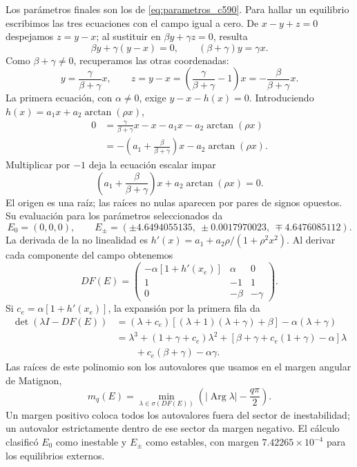 Los parámetros finales son los de \cref{eq:parametros_c590}.
Para hallar un equilibrio escribimos las tres ecuaciones con el campo
igual a cero. De \(x-y+z=0\) despejamos \(z=y-x\); al sustituir en
\(\beta y+\gamma z=0\), resulta
\[
 \beta y+\gamma(y-x)=0,
 \qquad(\beta+\gamma)y=\gamma x.
\]
Como \(\beta+\gamma\ne0\), recuperamos las otras coordenadas:
\[
 y=\frac{\gamma}{\beta+\gamma}x,\qquad
 z=y-x=\left(\frac{\gamma}{\beta+\gamma}-1\right)x
       =-\frac{\beta}{\beta+\gamma}x.
\]
La primera ecuación, con \(\alpha\ne0\), exige
\(y-x-h(x)=0\). Introduciendo \(h(x)=a_1x+a_2\arctan(\rho x)\),
\begin{align*}
 0&=\frac{\gamma}{\beta+\gamma}x-x-a_1x-a_2\arctan(\rho x)\\
  &=-\left(a_1+\frac{\beta}{\beta+\gamma}\right)x
       -a_2\arctan(\rho x).
\end{align*}
Multiplicar por \(-1\) deja la ecuación escalar impar
\[
 \left(a_1+\frac{\beta}{\beta+\gamma}\right)x
           +a_2\arctan(\rho x)=0.
\]
El origen es una raíz; las raíces no nulas aparecen por pares de signos
opuestos. Su evaluación para los parámetros seleccionados da
\begin{equation}
E_0=(0,0,0),\qquad
E_\pm=(\pm4.6494055135,\ \pm0.0017970023,\ \mp4.6476085112).
\label{eq:equilibrios_c590_resultados}
\end{equation}
La derivada de la no linealidad es
\(h'(x)=a_1+a_2\rho/(1+\rho^2x^2)\). Al derivar cada componente del
campo obtenemos
\[
 DF(E)=\begin{pmatrix}
 -\alpha[1+h'(x_e)]&\alpha&0\\
 1&-1&1\\0&-\beta&-\gamma
 \end{pmatrix}.
\]
Si \(c_e=\alpha[1+h'(x_e)]\), la expansión por la primera fila da
\begin{align*}
 \det(\lambda I-DF(E))
 &=(\lambda+c_e)[(\lambda+1)(\lambda+\gamma)+\beta]
       -\alpha(\lambda+\gamma)\\
 &=\lambda^3+(1+\gamma+c_e)\lambda^2
  +[\beta+\gamma+c_e(1+\gamma)-\alpha]\lambda\\
 &\hspace{2em}+c_e(\beta+\gamma)-\alpha\gamma.
\end{align*}
Las raíces de este polinomio son los autovalores que usamos en el margen
angular de Matignon,
\[
 m_q(E)=\min_{\lambda\in\sigma(DF(E))}
        \left(|\operatorname{Arg}\lambda|-\frac{q\pi}{2}\right).
\]
Un margen positivo coloca todos los autovalores fuera del sector de
inestabilidad; un autovalor estrictamente dentro de ese sector da margen
negativo. El cálculo clasificó \(E_0\) como inestable y \(E_\pm\) como
estables, con margen \(7.42265\times10^{-4}\) para los equilibrios externos.

